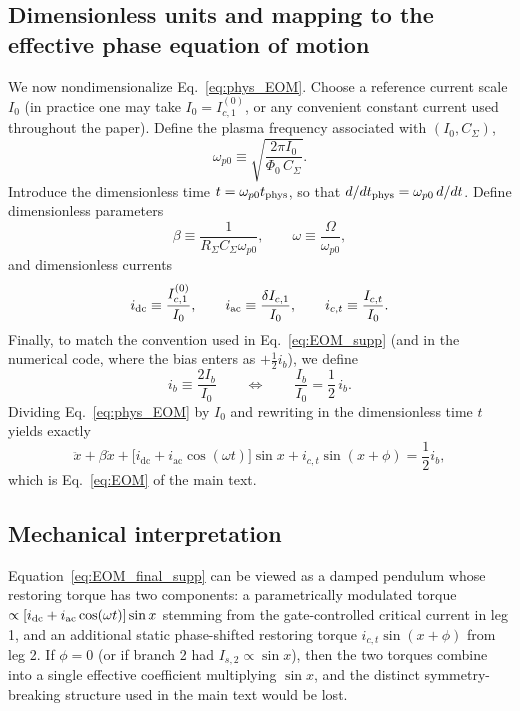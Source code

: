 \documentclass[prl,twocolumn,superscriptaddress,showpacs,nofootinbib]{revtex4-2}
\begin{document}
\subsection{Dimensionless units and mapping to the effective phase equation of motion}
We now nondimensionalize Eq.~\eqref{eq:phys_EOM}.
Choose a reference current scale $I_0$ (in practice one may take
$I_0=I_{c,1}^{(0)}$, or any convenient constant current used throughout the
paper). Define the plasma frequency associated with $(I_0,C_\Sigma)$,
\begin{equation}
\omega_{p0}\equiv
\sqrt{\frac{2\pi I_0}{\Phi_0\,C_\Sigma}}.
\label{eq:wp0_def}
\end{equation}
Introduce the dimensionless time $t=\omega_{p0}t_{\rm phys}$, so that
$d/dt_{\rm phys}=\omega_{p0}\,d/dt$.
Define dimensionless parameters
\begin{equation}
\beta \equiv \frac{1}{R_\Sigma C_\Sigma \omega_{p0}},
\qquad
\omega\equiv \frac{\Omega}{\omega_{p0}},
\label{eq:beta_omega_def}
\end{equation}
and dimensionless currents
\begin{equation}
i_{\rm dc}\equiv \frac{I_{c,1}^{(0)}}{I_0},
\qquad
i_{\rm ac}\equiv \frac{\delta I_{c,1}}{I_0},
\qquad
i_{c,t}\equiv \frac{I_{c,t}}{I_0}.
\label{eq:dimensionless_Ic}
\end{equation}
Finally, to match the convention used in Eq.~\eqref{eq:EOM_supp} (and in the
numerical code, where the bias enters as $+\tfrac12 i_b$), we define
\begin{equation}
i_b \equiv \frac{2 I_b}{I_0}
\qquad \Longleftrightarrow \qquad
\frac{I_b}{I_0}=\frac12\,i_b.
\label{eq:ib_convention}
\end{equation}
Dividing Eq.~\eqref{eq:phys_EOM} by $I_0$ and rewriting in the dimensionless
time $t$ yields exactly
\begin{equation}
\ddot x + \beta \dot x
+ \big[i_{\mathrm{dc}}+i_{\mathrm{ac}}\cos(\omega t)\big]\sin x
+ i_{c,t} \sin(x+\phi)
= \frac{1}{2} i_b ,
\label{eq:EOM_final_supp}
\end{equation}
which is Eq.~\eqref{eq:EOM} of the main text.

\subsection{Mechanical interpretation}
Equation~\eqref{eq:EOM_final_supp} can be viewed as a damped pendulum whose restoring torque has two components: a parametrically modulated torque $\propto [i_{\rm dc}+i_{\rm ac}\cos(\omega t)]\sin x$
stemming from the gate-controlled critical current in leg 1, and  an additional static phase-shifted restoring torque $i_{c,t}\sin(x+\phi)$ from leg 2. If $\phi=0$ (or if branch 2 had $I_{s,2}\propto \sin x$), then the two torques combine into a single effective coefficient multiplying $\sin x$, and the distinct symmetry-breaking structure used in the main text would be lost.
\end{document}
